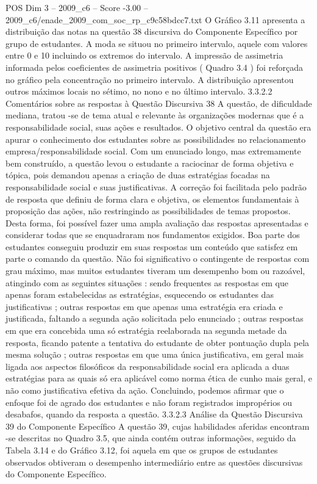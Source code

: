 \begin{textsample}{POS Dim 3 – 2009\_c6 – Score -3.00 – 2009\_c6/enade\_2009\_com\_soc\_rp\_c9c58bdcc7.txt}
O Gráfico 3.11 apresenta a distribuição das notas na questão 38 discursiva do Componente Específico por grupo de estudantes.
A moda se situou no primeiro intervalo, aquele com valores entre 0 e 10 incluindo os extremos do intervalo.
A impressão de assimetria informada pelos coeficientes de assimetria positivos ( Quadro 3.4 ) foi reforçada no gráfico pela concentração no primeiro intervalo.
A distribuição apresentou outros máximos locais no sétimo, no nono e no último intervalo. 3.3.2.2 Comentários sobre as respostas à Questão Discursiva 38 A questão, de dificuldade mediana, tratou -se de tema atual e relevante às organizações modernas que é a responsabilidade social, suas ações e resultados.
O objetivo central da questão era apurar o conhecimento dos estudantes sobre as possibilidades no relacionamento empresa/responsabilidade social.
Com um enunciado longo, mas extremamente bem construído, a questão levou o estudante a raciocinar de forma objetiva e tópica, pois demandou apenas a criação de duas estratégias focadas na responsabilidade social e suas justificativas.
A correção foi facilitada pelo padrão de resposta que definiu de forma clara e objetiva, os elementos fundamentais à proposição das ações, não restringindo as possibilidades de temas propostos.
Desta forma, foi possível fazer uma ampla avaliação das respostas apresentadas e considerar todas que se enquadraram nos fundamentos exigidos.
Boa parte dos estudantes conseguiu produzir em suas respostas um conteúdo que satisfez em parte o comando da questão.
Não foi significativo o contingente de respostas com grau máximo, mas muitos estudantes tiveram um desempenho bom ou razoável, atingindo com as seguintes situações : sendo frequentes as respostas em que apenas foram estabelecidas as estratégias, esquecendo os estudantes das justificativas ; outras respostas em que apenas uma estratégia era criada e justificada, faltando a segunda ação solicitada pelo enunciado ; outras respostas em que era concebida uma só estratégia reelaborada na segunda metade da resposta, ficando patente a tentativa do estudante de obter pontuação dupla pela mesma solução ; outras respostas em que uma única justificativa, em geral mais ligada aos aspectos filosóficos da responsabilidade social era aplicada a duas estratégias para as quais só era aplicável como norma ética de cunho mais geral, e não como justificativa efetiva da ação.
Concluindo, podemos afirmar que o enfoque foi de agrado dos estudantes e não foram registrados impropérios ou desabafos, quando da resposta a questão. 3.3.2.3 Análise da Questão Discursiva 39 do Componente Específico A questão 39, cujas habilidades aferidas encontram -se descritas no Quadro 3.5, que ainda contém outras informações, seguido da Tabela 3.14 e do Gráfico 3.12, foi aquela em que os grupos de estudantes observados obtiveram o desempenho intermediário entre as questões discursivas do Componente Específico.

\end{textsample}
